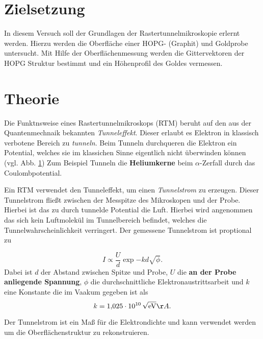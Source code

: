 \setcounter{page}{1}
\section*{Zielsetzung}
In diesem Versuch soll der Grundlagen der Rastertunnelmikroskopie
erlernt werden. Hierzu werden die Oberfläche einer HOPG- (Graphit) und
Goldprobe untersucht. Mit Hilfe der Oberflächenmessung werden die Gittervektoren
der HOPG Struktur bestimmt und ein Höhenprofil des Goldes vermessen.

\section{Theorie}
Die Funktnsweise eines  Rastertunnelmikroskops (RTM) beruht auf den aus der Quantenmechnaik bekannten
\emph{Tunneleffekt}. Dieser erlaubt es Elektron in klassisch verbotene Bereich zu \emph{tunneln}.
Beim Tunneln durchqueren die Elektron ein Potential, welches sie im klassichen Sinne
eigentlich nicht überwinden können (vgl. Abb. \ref{})
Zum Beispiel Tunneln die \textbf{Heliumkerne} beim $\alpha$-Zerfall durch das Coulombpotential.

Ein RTM verwendet den Tunneleffekt, um einen \emph{Tunnelstrom} zu erzeugen. Dieser Tunnelstrom
fließt zwischen der Messpitze des Mikroskopen und der Probe. Hierbei ist das zu durch tunnelde
Potential die Luft. Hierbei wird angenommen das sich kein Luftmolekül im Tunnelbereich befindet, welches
die Tunnelwahrscheinlichkeit verringert. Der gemessene Tunnelstrom ist proptional zu

\begin{equation}
  \label{eq: tunnelstrom}
I\propto \frac{U}{d}\exp{-kd\sqrt{\phi}}.
\end{equation}
Dabei ist $d$ der Abstand zwischen Spitze und Probe, $U$ die \textbf{an der Probe anliegende Spannung},
$\phi$ die durchschnittliche Elektronaustrittsarbeit und $k$ eine Konstante die im Vaakum gegeben ist als
\begin{equation*}
  k=\SI{1.025e10}{\per\sqrt{\eV}} \AA.
\end{equation*}

Der Tunnelstrom ist ein Maß für die Elektrondichte und kann verwendet werden um die Oberflächenstruktur
zu rekonstruieren.

